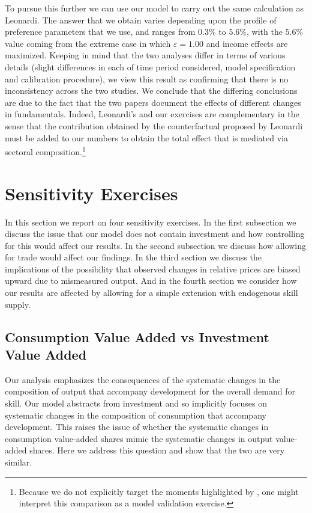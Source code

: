\documentclass[12pt,english]{article}
\begin{document}
{\normalsize To pursue this further we can use our model to carry out the
same calculation as Leonardi. The answer that we obtain varies depending
upon the profile of preference parameters that we use, and ranges from $0.3\%
$ to $5.6\%$, with the $5.6\%$ value coming from the extreme case in which $%
\varepsilon =1.00$ and income effects are maximized. Keeping in mind that
the two analyses differ in terms of various details (slight differences in
each of time period considered, model specification and calibration
procedure), we view this result as confirming that there is no inconsistency
across the two studies. We conclude that the differing conclusions are due
to the fact that the two papers document the effects of different changes in
fundamentals. Indeed, Leonardi's and our exercises are complementary in the
sense that the contribution obtained by the counterfactual proposed by
Leonardi must be added to our numbers to obtain the total effect that is
mediated via sectoral composition.\footnote{
Because we do not explicitly target the moments highlighted by
\citet{Leo15}, one might interpret this comparison as a model validation
exercise.} } 

\section{Sensitivity Exercises}

{\normalsize In this section we report on four sensitivity exercises. In the
first subsection we discuss the issue that our model does not contain
investment and how controlling for this would affect our results. In the
second subsection we discuss how allowing for trade would affect our
findings. In the third section we discuss the implications of the
possibility that observed changes in relative prices are biased upward due
to mismeasured output. And in the fourth section we consider how our results
are affected by allowing for a simple extension with endogenous skill
supply. }

\subsection{Consumption Value Added vs Investment Value
Added}

{\normalsize Our analysis emphasizes the consequences of the systematic
changes in the composition of output that accompany development for the
overall demand for skill. Our model abstracts from investment and so
implicitly focuses on systematic changes in the composition of consumption
that accompany development. This raises the issue of whether the systematic
changes in consumption value-added shares mimic the systematic changes in
output value-added shares. Here we address this question and show that the
two are very similar. }
\end{document}
